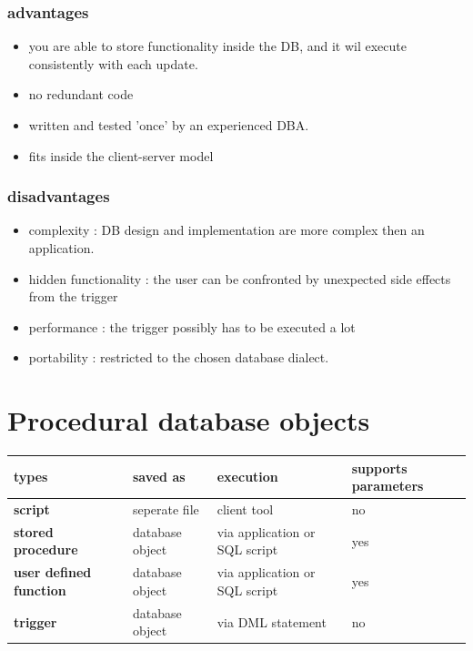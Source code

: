 \documentclass{report}
\begin{document}
	\subsubsection{advantages}
	\begin{itemize}
		\item you are able to store functionality inside the DB, and it wil execute consistently with each update.
		\item no redundant code 
		\item written and tested 'once' by an experienced DBA. 
		\item fits inside the client-server model
	\end{itemize}
	\subsubsection{disadvantages}
	\begin{itemize}
		\item complexity : DB design and implementation are more complex then an application.
		\item hidden functionality : the user can be confronted by unexpected side effects from the trigger
		\item performance : the trigger possibly has to be executed a lot
		\item portability : restricted to the chosen database dialect.
	\end{itemize}
	\section{Procedural database objects}
	\begin{center}
		\begin{tabular}{| m{12em} | m{7em} | m{13em} | m{11em} |}
			\hline
			\textbf{types} & \textbf{saved as} & \textbf{execution} & \textbf{supports parameters}\\
			\hline
			\textbf{script} & seperate file & client tool & no \\
			\hline
			\textbf{stored procedure} & database object & via application or SQL script & yes\\
			\hline
			\textbf{user defined function} & database object & via application or SQL script & yes\\
			\hline
			\textbf{trigger} & database object & via DML statement & no\\
			\hline
		\end{tabular}
	\end{center}
\end{document}

